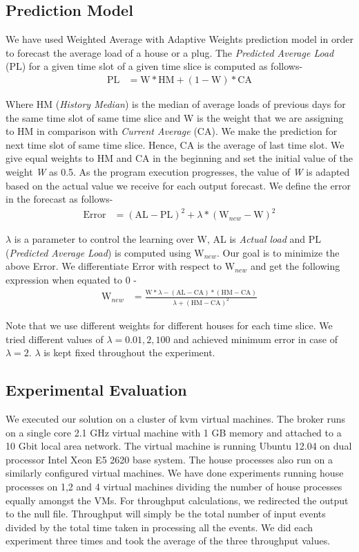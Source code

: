 \subsection{Prediction Model}
We have used Weighted Average with Adaptive Weights prediction model in order to forecast the average load of a house or a plug. The \textit{Predicted Average Load} (PL) for a given time slot of a given time slice is computed as follows-
\begin{align*}
\mbox{PL} &= \mbox{W}*\mbox{HM}  + (1-\mbox{W})*\mbox{CA}
\end{align*}

\noindent Where HM (\textit{History Median}) is the median of average loads of previous days for the same time slot of same time slice and W is the weight that we are assigning to HM in comparison with \textit{Current Average} (CA). We make the prediction for next time slot of same time slice.
Hence, CA is the average of last time slot.
We give equal weights to HM and CA in the beginning and set the initial value of the weight \textit{W} as 0.5. As the program execution progresses, the value of \textit{W} is adapted based on the actual value we receive for each output forecast.
We define the error in the forecast as follows-
\begin{align*}
\mbox{Error} &= (\mbox{AL} - \mbox{PL})^2 + \lambda * (\mbox{W}_{new} - \mbox{W})^2
\end{align*}

\noindent $\lambda$ is a parameter to control the learning over W, AL is \textit{Actual load} and PL (\textit{Predicted Average Load}) is computed using $\mbox{W}_{new}$.
Our goal is to minimize the above Error.
We differentiate Error with respect to $\mbox{W}_{new}$ and get the following expression when equated to 0 -
\begin{align*}
\mbox{W}_{new} &= \frac{\mbox{W}*\lambda-(\mbox{AL}-\mbox{CA}) * (\mbox{HM}-\mbox{CA})}{\lambda + (\mbox{HM}-\mbox{CA})^2}
\end{align*}

Note that we use different weights for different houses for each time slice. We tried different values of $\lambda=0.01, 2, 100$ and achieved minimum error in case of $\lambda = 2$. $\lambda$ is kept fixed throughout the experiment.

\subsection{Experimental Evaluation}
We executed our solution on a cluster of kvm virtual machines. The broker runs on a single core 2.1 GHz virtual machine with 1 GB memory and attached to a 10 Gbit local area network. The virtual machine is running Ubuntu 12.04 on dual processor Intel Xeon E5 2620 base system.
The house processes also run on a similarly configured virtual machines. We have done experiments running house processes on 1,2 and 4 virtual machines dividing the number of house processes equally amongst the VMs. For throughput calculations, we redirected the output to the null file. Throughput will simply be the total number of input events divided by the total time taken in processing all the events.
We did each experiment three times and took the average of the three throughput values.

